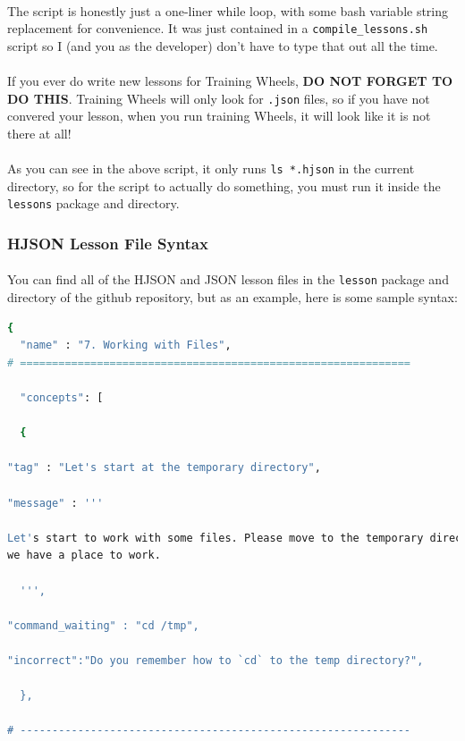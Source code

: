 \documentclass[11pt]{article}
\begin{document}
	\paragraph{} The script is honestly just a one-liner while loop, with some bash variable string replacement for convenience. It was just contained in a \texttt{compile\_lessons.sh} script so I (and you as the developer) don't have to type that out all the time.

	\paragraph{} If you ever do write new lessons for Training Wheels, \textbf{DO NOT FORGET TO DO THIS}. Training Wheels will only look for \texttt{.json} files, so if you have not convered your lesson, when you run training Wheels, it will look like it is not there at all!

	\paragraph{} As you can see in the above script, it only runs \texttt{ls *.hjson} in the current directory, so for the script to actually do something, you must run it inside the \texttt{lessons} package and directory.

	\newpage

	\subsubsection{HJSON Lesson File Syntax}

	\paragraph{} You can find all of the HJSON and JSON lesson files in the \texttt{lesson} package and directory of the github repository, but as an example, here is some sample syntax:


	\begin{lstlisting}[language=Bash]
{
  "name" : "7. Working with Files",
# =============================================================

  "concepts": [

  {
    
"tag" : "Let's start at the temporary directory",

"message" : '''

Let's start to work with some files. Please move to the temporary directory so
we have a place to work.

  ''',

"command_waiting" : "cd /tmp",

"incorrect":"Do you remember how to `cd` to the temp directory?",

  },

# -------------------------------------------------------------

\end{lstlisting}	
\end{document}
